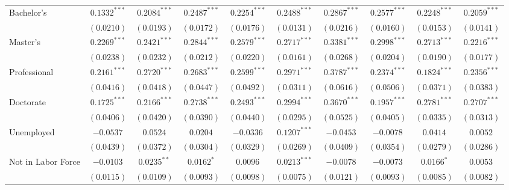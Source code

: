 \documentclass{article}
\begin{document}
\begin{table}
\begin{center}
\begin{tabular}{l c c c c c c c c c}
Bachelor's                     & $0.1332^{***}$  & $0.2084^{***}$  & $0.2487^{***}$  & $0.2254^{***}$  & $0.2488^{***}$  & $0.2867^{***}$  & $0.2577^{***}$  & $0.2248^{***}$  & $0.2059^{***}$  \\
                               & $(0.0210)$      & $(0.0193)$      & $(0.0172)$      & $(0.0176)$      & $(0.0131)$      & $(0.0216)$      & $(0.0160)$      & $(0.0153)$      & $(0.0141)$      \\
Master's                       & $0.2269^{***}$  & $0.2421^{***}$  & $0.2844^{***}$  & $0.2579^{***}$  & $0.2717^{***}$  & $0.3381^{***}$  & $0.2998^{***}$  & $0.2713^{***}$  & $0.2216^{***}$  \\
                               & $(0.0238)$      & $(0.0232)$      & $(0.0212)$      & $(0.0220)$      & $(0.0161)$      & $(0.0268)$      & $(0.0204)$      & $(0.0190)$      & $(0.0177)$      \\
Professional                   & $0.2161^{***}$  & $0.2720^{***}$  & $0.2683^{***}$  & $0.2599^{***}$  & $0.2971^{***}$  & $0.3787^{***}$  & $0.2374^{***}$  & $0.1824^{***}$  & $0.2356^{***}$  \\
                               & $(0.0416)$      & $(0.0418)$      & $(0.0447)$      & $(0.0492)$      & $(0.0311)$      & $(0.0616)$      & $(0.0506)$      & $(0.0371)$      & $(0.0383)$      \\
Doctorate                      & $0.1725^{***}$  & $0.2166^{***}$  & $0.2738^{***}$  & $0.2493^{***}$  & $0.2994^{***}$  & $0.3670^{***}$  & $0.1957^{***}$  & $0.2781^{***}$  & $0.2707^{***}$  \\
                               & $(0.0406)$      & $(0.0420)$      & $(0.0390)$      & $(0.0440)$      & $(0.0295)$      & $(0.0525)$      & $(0.0405)$      & $(0.0335)$      & $(0.0313)$      \\
Unemployed                     & $-0.0537$       & $0.0524$        & $0.0204$        & $-0.0336$       & $0.1207^{***}$  & $-0.0453$       & $-0.0078$       & $0.0414$        & $0.0052$        \\
                               & $(0.0439)$      & $(0.0372)$      & $(0.0304)$      & $(0.0329)$      & $(0.0269)$      & $(0.0409)$      & $(0.0354)$      & $(0.0279)$      & $(0.0286)$      \\
Not in Labor Force             & $-0.0103$       & $0.0235^{**}$   & $0.0162^{*}$    & $0.0096$        & $0.0213^{***}$  & $-0.0078$       & $-0.0073$       & $0.0166^{*}$    & $0.0053$        \\
                               & $(0.0115)$      & $(0.0109)$      & $(0.0093)$      & $(0.0098)$      & $(0.0075)$      & $(0.0121)$      & $(0.0093)$      & $(0.0085)$      & $(0.0082)$      \\

\end{tabular}
\end{center}
\end{table}
\end{document}

